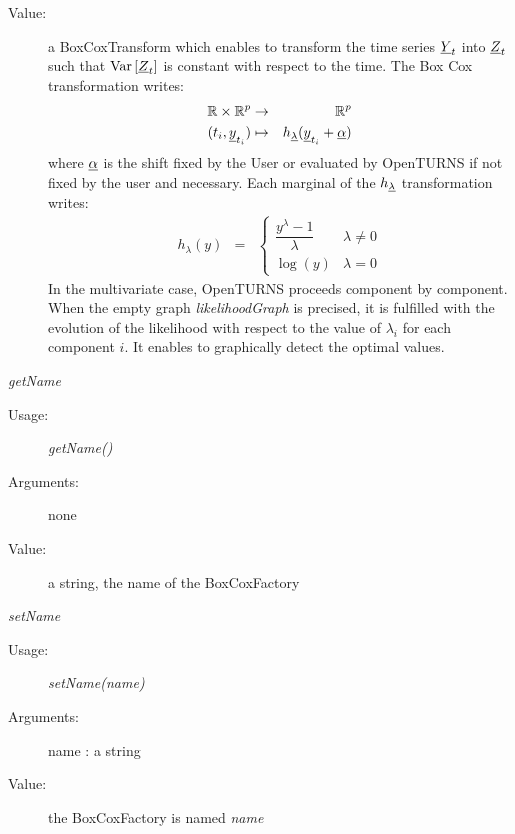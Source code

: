 \begin{description}
\begin{description}
\begin{description}
\item[Value:]  a BoxCoxTransform which enables to transform the time series  ${\underline{Y}}_t$ into ${\underline{Z}}_t$ such that  ${\rm Var}\left[ {\underline{Z}}_t \right]$ is constant  with respect to the time. The Box Cox transformation writes:
\begin{eqnarray}
\label{BoxCoxModel}
{\mathbb R} \times {\mathbb R}^{p} & \rightarrow & {\mathbb R}^{p} \\ \nonumber
(t_i,{\underline{y}}_{t_i})  & \mapsto & h_{{\underline{\lambda}}}({\underline{y}}_{t_i} + {\underline{\alpha}})
\end{eqnarray}
where ${\underline{\alpha}}$ is the shift fixed by the User or evaluated by OpenTURNS if not fixed by the user and necessary. Each marginal of  the $ h_{{\underline{\lambda}}}$ transformation writes:
\begin{eqnarray}
\label{hLambda}
h_\lambda(y) & = &
\left\{
\begin{array}{ll}
\dfrac{y^\lambda-1}{\lambda} & \lambda \neq 0 \\
\log(y)                        & \lambda = 0
\end{array}
\right.
\end{eqnarray}
In the multivariate case, OpenTURNS proceeds component by component. \\
When the empty graph \textit{likelihoodGraph} is precised, it is fulfilled
with the evolution of the likelihood with respect to the value of
$\lambda_i$ for each component  $i$. It enables to graphically detect the optimal values.
\end{description}
\bigskip


\item \textit{getName}
\begin{description}
\item[Usage:] \textit{getName()}
\item[Arguments:] none
\item[Value:] a string, the name of the BoxCoxFactory
\end{description}
\bigskip

\item \textit{setName}
\begin{description}
\item[Usage:] \textit{setName(name)}
\item[Arguments:] name : a string
\item[Value:] the BoxCoxFactory is named \textit{name}
\end{description}
\bigskip


\end{description}

\end{description}


